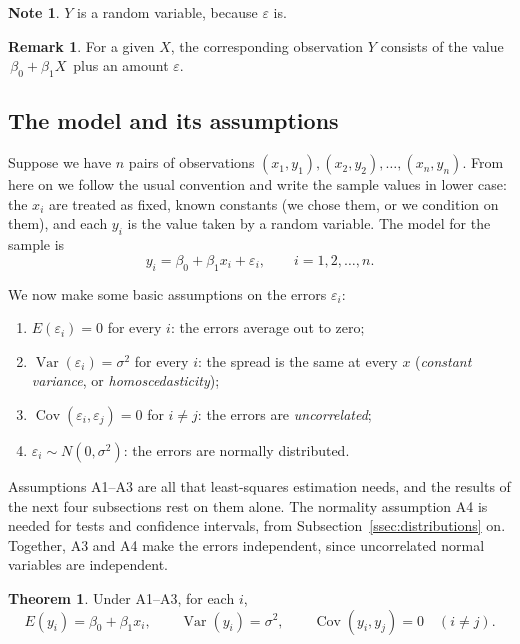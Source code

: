 \documentclass[11pt,a4paper]{article}
\numberwithin{equation}{section}
\theoremstyle{definition}
\newtheorem{thm}{Theorem}[subsection]
\newtheorem*{note}{Note}
\newtheorem*{remark}{Remark}
\begin{document}
\begin{note}
$Y$ is a random variable, because $\varepsilon$ is.
\end{note}

\begin{remark}
For a given $X$, the corresponding observation $Y$ consists of the value $\, \beta_0 + \beta_1X\,$ plus an amount $\varepsilon$.
\end{remark}

\subsection{The model and its assumptions}
Suppose we have $n$ pairs of observations $(x_1,y_1), (x_2,y_2), \dots, (x_n,y_n)$. From
here on we follow the usual convention and write the sample values in lower case: the
$x_i$ are treated as fixed, known constants (we chose them, or we condition on them), and
each $y_i$ is the value taken by a random variable. The model for the sample is
\begin{equation}\label{eq:slr-sample}
y_i = \beta_0 + \beta_1 x_i + \varepsilon_i, \qquad i = 1, 2, \dots, n.
\end{equation}

We now make some basic assumptions on the errors $\varepsilon_i$:
\begin{enumerate}[label=\textbf{A\arabic*.}]
\item $E(\varepsilon_i) = 0$ for every $i$: the errors average out to zero;
\item $\operatorname{Var}(\varepsilon_i) = \sigma^2$ for every $i$: the spread is the same at every $x$ (\emph{constant variance}, or \emph{homoscedasticity});
\item $\operatorname{Cov}(\varepsilon_i, \varepsilon_j) = 0$ for $i \neq j$: the errors are \emph{uncorrelated};
\item $\varepsilon_i \sim N(0, \sigma^2)$: the errors are normally distributed.
\end{enumerate}
Assumptions A1--A3 are all that least-squares estimation needs, and the results of the
next four subsections rest on them alone. The normality assumption A4 is needed for tests
and confidence intervals, from Subsection~\ref{ssec:distributions} on. Together, A3 and A4
make the errors independent, since uncorrelated normal variables are independent.

\begin{thm}\label{thm:mean-var-y}
Under A1--A3, for each $i$,
\[
E(y_i) = \beta_0 + \beta_1 x_i, \qquad \operatorname{Var}(y_i) = \sigma^2, \qquad
\operatorname{Cov}(y_i, y_j) = 0 \quad (i \neq j).
\]
\end{thm}
\end{document}
